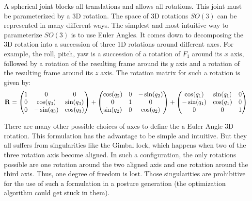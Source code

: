 A spherical joint blocks all translations and allows all rotations. This joint must be parameterized by a 3D rotation. The space of 3D rotations $SO(3)$ can be represented in many different ways.
The simplest and most intuitive way to parameterize $SO(3)$ is to use Euler Angles.
It comes down to decomposing the 3D rotation into a succession of three 1D rotations around different axes.
For example, the roll, pitch, yaw is a succession of a rotation of $F_1$ around its $x$ axis, followed by a rotation of the resulting frame around its $y$ axis and a rotation of the resulting frame around its $z$ axis.
The rotation matrix for such a rotation is given by:
\begin{equation}
  {\bf R} =
  \begin{pmatrix}
    1 & 0 & 0 \\
    0 & \cos(q_3) & \sin(q_3) \\
    0 & -\sin(q_3) & \cos(q_3) \\
  \end{pmatrix}
  +
  \begin{pmatrix}
    \cos(q_2) & 0 & -\sin(q_2) \\
    0 & 1 & 0 \\
    \sin(q_2) & 0 & \cos(q_2) \\
  \end{pmatrix}
  +
  \begin{pmatrix}
    \cos(q_1) & \sin(q_1) & 0 \\
    -\sin(q_1) & \cos(q_1) & 0 \\
    0 & 0 & 1
  \end{pmatrix}
\end{equation}

There are many other possible choices of axes to define the a Euler Angle 3D rotation.
This formulation has the advantage to be simple and intuitive.
But they all suffers from singularities like the Gimbal lock, which happens when two of the three rotation axis become aligned.
In such a configuration, the only rotations possible are one rotation around the two aligned axis and one rotation around the third axis.
Thus, one degree of freedom is lost.
Those singularities are prohibitive for the use of such a formulation in a posture generation (the optimization algorithm could get stuck in them).

